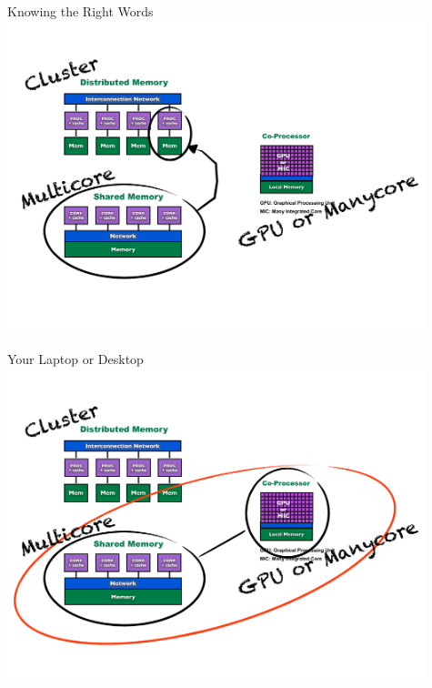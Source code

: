 \begin{frame}
\begin{block}{Knowing the Right Words}
    \includegraphics[width=0.91\textwidth]{pics/ParallelHardware3.pdf}
\end{block}
\end{frame}

\begin{frame}
\begin{block}{Your Laptop or Desktop}
    \includegraphics[width=0.91\textwidth]{pics/ParallelHardware4.pdf}
\end{block}
\end{frame}

